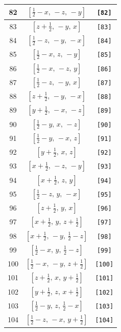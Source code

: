 \documentclass[fleqn,8pt]{jsarticle}
\begin{document}
\begin{longtable}{ccc}
82 & $\left[ \frac{1}{2} - x,\, - z,\, - y \right]$ & {\tt [82]} \\ \hline
83 & $\left[ z + \frac{1}{2},\, - y,\, x \right]$ & {\tt [83]} \\ \hline
84 & $\left[ \frac{1}{2} - z,\, - y,\, - x \right]$ & {\tt [84]} \\ \hline
85 & $\left[ \frac{1}{2} - x,\, z,\, - y \right]$ & {\tt [85]} \\ \hline
86 & $\left[ \frac{1}{2} - x,\, - z,\, y \right]$ & {\tt [86]} \\ \hline
87 & $\left[ \frac{1}{2} - z,\, - y,\, x \right]$ & {\tt [87]} \\ \hline
88 & $\left[ z + \frac{1}{2},\, - y,\, - x \right]$ & {\tt [88]} \\ \hline
89 & $\left[ y + \frac{1}{2},\, - x,\, - z \right]$ & {\tt [89]} \\ \hline
90 & $\left[ \frac{1}{2} - y,\, x,\, - z \right]$ & {\tt [90]} \\ \hline
91 & $\left[ \frac{1}{2} - y,\, - x,\, z \right]$ & {\tt [91]} \\ \hline
92 & $\left[ y + \frac{1}{2},\, x,\, z \right]$ & {\tt [92]} \\ \hline
93 & $\left[ x + \frac{1}{2},\, - z,\, - y \right]$ & {\tt [93]} \\ \hline
94 & $\left[ x + \frac{1}{2},\, z,\, y \right]$ & {\tt [94]} \\ \hline
95 & $\left[ \frac{1}{2} - z,\, y,\, - x \right]$ & {\tt [95]} \\ \hline
96 & $\left[ z + \frac{1}{2},\, y,\, x \right]$ & {\tt [96]} \\ \hline
97 & $\left[ x + \frac{1}{2},\, y,\, z + \frac{1}{2} \right]$ & {\tt [97]} \\ \hline
98 & $\left[ x + \frac{1}{2},\, - y,\, \frac{1}{2} - z \right]$ & {\tt [98]} \\ \hline
99 & $\left[ \frac{1}{2} - x,\, y,\, \frac{1}{2} - z \right]$ & {\tt [99]} \\ \hline
100 & $\left[ \frac{1}{2} - x,\, - y,\, z + \frac{1}{2} \right]$ & {\tt [100]} \\ \hline
101 & $\left[ z + \frac{1}{2},\, x,\, y + \frac{1}{2} \right]$ & {\tt [101]} \\ \hline
102 & $\left[ y + \frac{1}{2},\, z,\, x + \frac{1}{2} \right]$ & {\tt [102]} \\ \hline
103 & $\left[ \frac{1}{2} - y,\, z,\, \frac{1}{2} - x \right]$ & {\tt [103]} \\ \hline
104 & $\left[ \frac{1}{2} - z,\, - x,\, y + \frac{1}{2} \right]$ & {\tt [104]} \\ \hline

\end{longtable}
\end{document}

